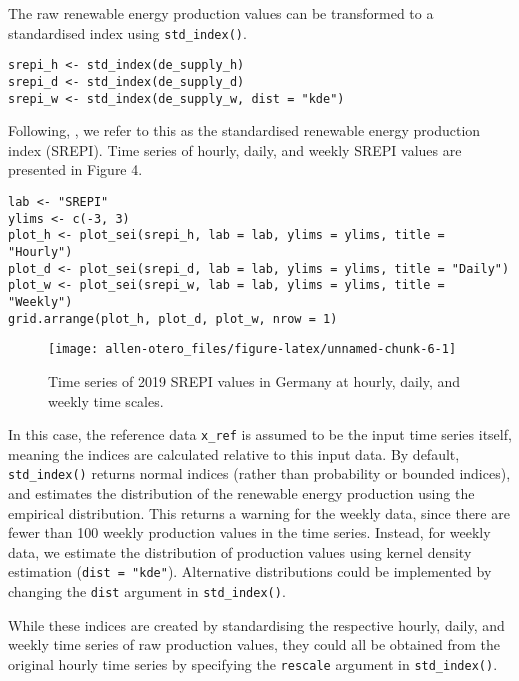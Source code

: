 The raw renewable energy production values can be transformed to a standardised index using \texttt{std\_index()}.

\begin{verbatim}
srepi_h <- std_index(de_supply_h)
srepi_d <- std_index(de_supply_d)
srepi_w <- std_index(de_supply_w, dist = "kde")
\end{verbatim}

Following, \cite{AllenOtero2023}, we refer to this as the standardised renewable energy production index (SREPI). Time series of hourly, daily, and weekly SREPI values are presented in Figure 4.

\begin{verbatim}
lab <- "SREPI"
ylims <- c(-3, 3)
plot_h <- plot_sei(srepi_h, lab = lab, ylims = ylims, title = "Hourly")
plot_d <- plot_sei(srepi_d, lab = lab, ylims = ylims, title = "Daily")
plot_w <- plot_sei(srepi_w, lab = lab, ylims = ylims, title = "Weekly")
grid.arrange(plot_h, plot_d, plot_w, nrow = 1)
\end{verbatim}

\begin{figure}

{\centering \texttt{[image: allen-otero\_files/figure-latex/unnamed-chunk-6-1]} 

}

\caption{Time series of 2019 SREPI values in Germany at hourly, daily, and weekly time scales.}\label{fig:unnamed-chunk-6}
\end{figure}

In this case, the reference data \texttt{x\_ref} is assumed to be the input time series itself, meaning the indices are calculated relative to this input data. By default, \texttt{std\_index()} returns normal indices (rather than probability or bounded indices), and estimates the distribution of the renewable energy production using the empirical distribution. This returns a warning for the weekly data, since there are fewer than 100 weekly production values in the time series. Instead, for weekly data, we estimate the distribution of production values using kernel density estimation (\texttt{dist\ =\ "kde"}). Alternative distributions could be implemented by changing the \texttt{dist} argument in \texttt{std\_index()}.

While these indices are created by standardising the respective hourly, daily, and weekly time series of raw production values, they could all be obtained from the original hourly time series by specifying the \texttt{rescale} argument in \texttt{std\_index()}.

